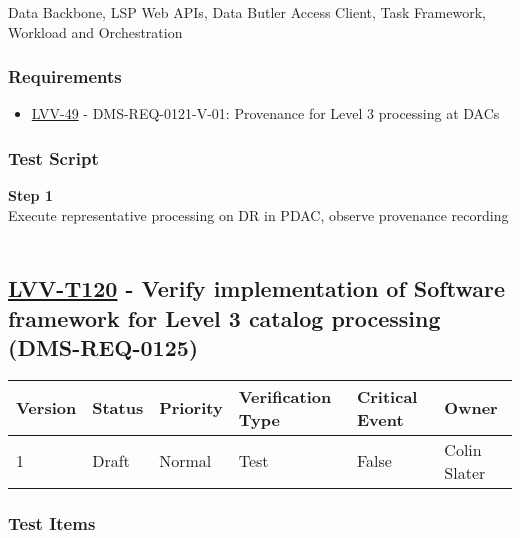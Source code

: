 Data Backbone, LSP Web APIs, Data Butler Access Client, Task Framework,
Workload and Orchestration~

\hypertarget{requirements-96}{%
\subsubsection{Requirements}\label{requirements-96}}

\begin{itemize}
\tightlist
\item
  \href{https://jira.lsstcorp.org/browse/LVV-49}{LVV-49} -
  DMS-REQ-0121-V-01: Provenance for Level 3 processing at DACs
\end{itemize}

\hypertarget{test-script-96}{%
\subsubsection{Test Script}\label{test-script-96}}

\textbf{Step 1}\\
Execute representative processing on DR in PDAC, observe provenance
recording\\
~\\

\hypertarget{lvv-t120---verify-implementation-of-software-framework-for-level-3-catalog-processing-dms-req-0125}{%
\subsection{\texorpdfstring{\href{https://jira.lsstcorp.org/secure/Tests.jspa\#/testCase/LVV-T120}{LVV-T120}
- Verify implementation of Software framework for Level 3 catalog
processing
(DMS-REQ-0125)}{LVV-T120 - Verify implementation of Software framework for Level 3 catalog processing (DMS-REQ-0125)}}\label{lvv-t120---verify-implementation-of-software-framework-for-level-3-catalog-processing-dms-req-0125}}

\begin{longtable}[]{@{}llllll@{}}
\toprule
Version & Status & Priority & Verification Type & Critical Event &
Owner\tabularnewline
\midrule
\endhead
1 & Draft & Normal & Test & False & Colin Slater\tabularnewline
\bottomrule
\end{longtable}

\hypertarget{test-items-96}{%
\subsubsection{Test Items}\label{test-items-96}}

